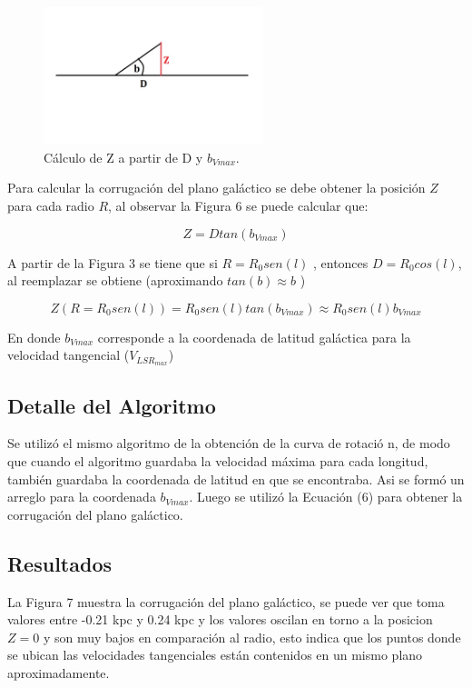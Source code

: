 \documentclass[letterpaper,oneside]{article}
\begin{document}
\begin{figure}
  \centering
  \includegraphics[height=4cm]{../graficos/imagenes/Corrugacion.jpg}
  \caption{Cálculo de Z a partir de D y $b_{Vmax}$.}
\end{figure}

Para calcular la corrugación del plano galáctico se debe obtener la posición $Z$ para cada radio $R$, al observar la Figura 6 se puede calcular que:

$$Z = D tan(b_{Vmax})$$

A partir de la Figura 3 se tiene que si $R = R_0 sen(l)$ , entonces $D = R_0 cos(l)$, al reemplazar se obtiene (aproximando $tan(b) \approx b $ )

\begin{equation}
    Z(R=R_0 sen(l)) = R_0 sen(l) tan(b_{Vmax}) \approx R_0 sen(l) b_{Vmax}
\end{equation}

En donde $b_{Vmax}$ corresponde a la coordenada de latitud galáctica para la velocidad tangencial ($V_{LSR}_{max}$)

\subsection{Detalle del Algoritmo}
Se utilizó el mismo algoritmo de la obtención de la curva de rotació
n, de modo que cuando el algoritmo guardaba la velocidad máxima para cada longitud, también guardaba la coordenada de latitud en que se encontraba. Asi se formó un arreglo para la coordenada $b_{Vmax}$. Luego se utilizó la Ecuación (6) para obtener la corrugación del plano galáctico.

\subsection{Resultados}
La Figura 7 muestra la corrugación del plano galáctico, se puede ver que toma valores entre -0.21 kpc y 0.24 kpc y los valores oscilan en torno a la posicion $Z=0$ y son muy bajos en comparación al radio, esto indica que los puntos donde se ubican las velocidades tangenciales están contenidos en un mismo plano aproximadamente.
\end{document}
